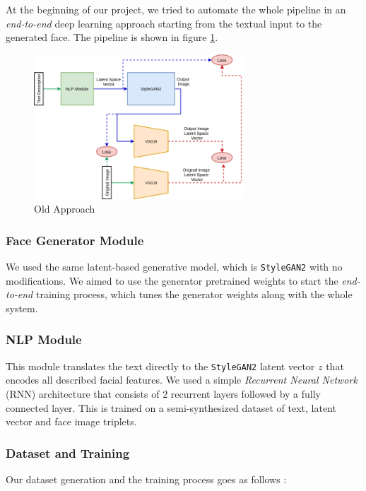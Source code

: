 At the beginning of our project, we tried to automate the whole pipeline in an \emph{end-to-end} deep learning approach starting from the textual input to the generated face. The pipeline is shown in figure \ref{fig:old}.

\begin{figure}[H]
    \centering
    \includegraphics[width=0.7\textwidth]{images/old.png}
    \caption{Old Approach}
    \label{fig:old}
\end{figure}

\subsubsection{Face Generator Module}

We used the same latent-based generative model, which is \texttt{StyleGAN2} with no modifications. We aimed to use the generator pretrained weights to start the \emph{end-to-end} training process, which tunes the generator weights along with the whole system.

\subsubsection{NLP Module}

This module translates the text directly to the \texttt{StyleGAN2} latent vector $z$ that encodes all described facial features. We used a simple \emph{Recurrent Neural Network} (RNN) architecture that consists of $2$ recurrent layers followed by a fully connected layer. This is trained on a semi-synthesized dataset of text, latent vector and face image triplets.

\subsubsection{Dataset and Training}

Our dataset generation and the training process goes as follows :

